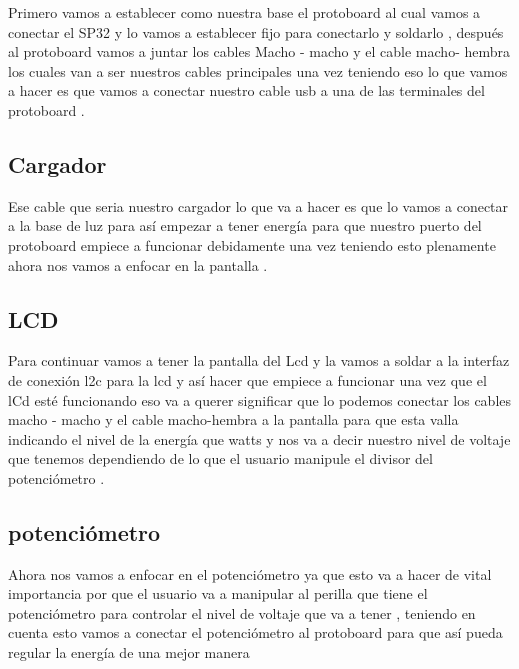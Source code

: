     Primero vamos a establecer como nuestra base el protoboard al cual vamos a conectar el SP32  y lo vamos a establecer fijo para conectarlo y soldarlo  , después al protoboard vamos a juntar los cables Macho - macho y el cable macho- hembra los cuales van a ser nuestros cables principales una vez teniendo eso lo que vamos a hacer es que vamos a conectar nuestro cable usb a una de las terminales del protoboard .
    \subsection{Cargador }
    Ese cable que seria nuestro cargador lo que va a hacer es que lo vamos a conectar a la base de luz para así empezar a tener energía  para que nuestro  puerto del protoboard empiece a funcionar debidamente  una vez teniendo esto plenamente  ahora nos vamos a enfocar en la pantalla .
    
    \subsection{LCD}
    
    Para continuar  vamos a tener la pantalla del Lcd y la vamos a soldar a la interfaz de conexión l2c para la lcd y así hacer que empiece a funcionar  una vez que el lCd esté funcionando eso va a querer significar que lo podemos conectar los cables macho - macho y el cable macho-hembra  a la pantalla para que esta valla indicando  el nivel de la energía que watts y nos va a decir nuestro nivel de voltaje que tenemos dependiendo de lo que el usuario manipule el divisor del potenciómetro . 
    
    \subsection{potenciómetro }
    Ahora nos vamos a enfocar en el potenciómetro  ya que esto va a hacer de vital importancia por que el usuario va a manipular al perilla que tiene el potenciómetro  para controlar el nivel de voltaje que va a tener , teniendo en cuenta  esto vamos a conectar el potenciómetro  al protoboard para que así pueda regular la energía de una mejor manera
    
